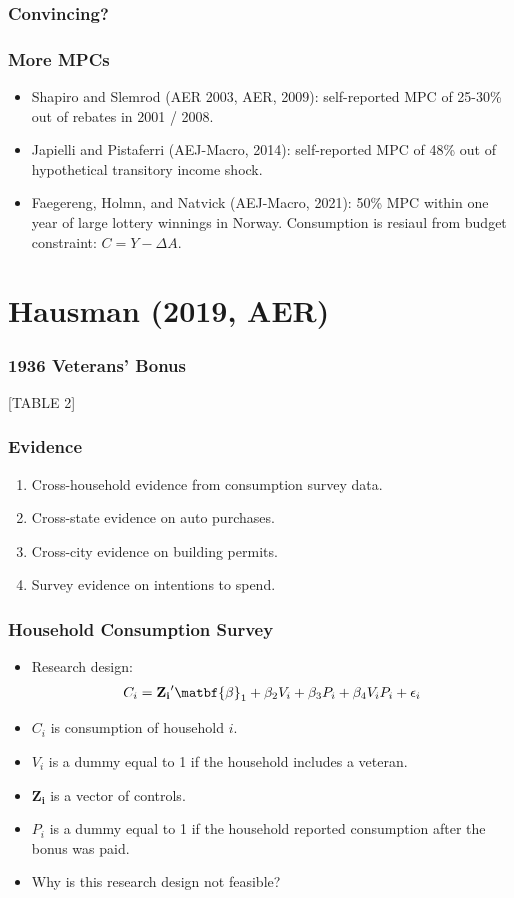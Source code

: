 \documentclass[english,xcolor=svgnames]{beamer}
\begin{document}
\begin{frame}
\frametitle[alignment=center]{Convincing?}

\end{frame}

\begin{frame}
\frametitle[alignment=center]{More MPCs}
\begin{itemize}
	\item Shapiro and Slemrod (AER 2003, AER, 2009): self-reported MPC of 25-30\% out of rebates in 2001 / 2008.
	\item Japielli and Pistaferri (AEJ-Macro, 2014): self-reported MPC of 48\% out of hypothetical transitory income shock.
	\item Faegereng, Holmn, and Natvick (AEJ-Macro, 2021): 50\% MPC within one year of large lottery winnings in Norway. Consumption is resiaul from budget constraint: $C=Y - \Delta A$.
\end{itemize}
\end{frame}

\section{Hausman (2019, AER)}

\begin{frame}
	\frametitle[alignment=center]{1936 Veterans' Bonus}
	[TABLE 2]
\end{frame}

\begin{frame}
	\frametitle[alignment=center]{Evidence}
	\begin{enumerate}
		\item Cross-household evidence from consumption survey data.
		\item Cross-state evidence on auto purchases.
		\item Cross-city evidence on building permits.
		\item Survey evidence on intentions to spend.
	\end{enumerate}
\end{frame}

\begin{frame}
	\frametitle[alignment=center]{Household Consumption Survey}
	\begin{itemize}
		\item Research design:
		\begin{align*}
			C_i = \mathbf{Z_i}'\matbf{\beta}_1 + \beta_2 V_i + \beta_3 P_i + \beta_4 V_i P_i + \epsilon_i
		\end{align*}
		\item $C_i$ is consumption of household $i$.
		\item $V_i$ is a dummy equal to 1 if the household includes a veteran.
		\item $\mathbf{Z_i}$ is a vector of controls.
		\item $P_i$ is a dummy equal to 1 if the household reported consumption after the bonus was paid.
		\item Why is this research design not feasible?
	\end{itemize}
\end{frame}
\end{document}
